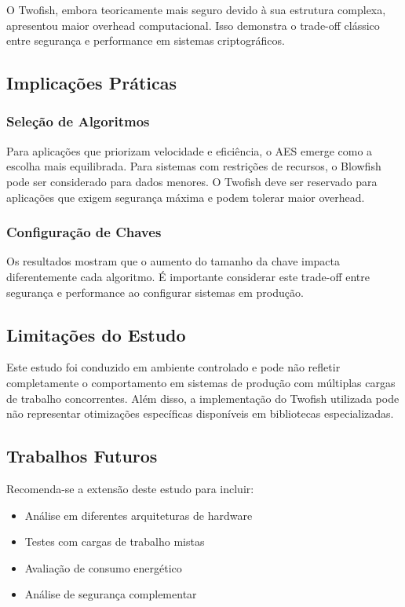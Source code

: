 \documentclass[12pt,a4paper,oneside]{article}
\begin{document}
O Twofish, embora teoricamente mais seguro devido à sua estrutura complexa, apresentou maior overhead computacional. Isso demonstra o trade-off clássico entre segurança e performance em sistemas criptográficos.

\subsection{Implicações Práticas}

\subsubsection{Seleção de Algoritmos}

Para aplicações que priorizam velocidade e eficiência, o AES emerge como a escolha mais equilibrada. Para sistemas com restrições de recursos, o Blowfish pode ser considerado para dados menores. O Twofish deve ser reservado para aplicações que exigem segurança máxima e podem tolerar maior overhead.

\subsubsection{Configuração de Chaves}

Os resultados mostram que o aumento do tamanho da chave impacta diferentemente cada algoritmo. É importante considerar este trade-off entre segurança e performance ao configurar sistemas em produção.

\subsection{Limitações do Estudo}

Este estudo foi conduzido em ambiente controlado e pode não refletir completamente o comportamento em sistemas de produção com múltiplas cargas de trabalho concorrentes. Além disso, a implementação do Twofish utilizada pode não representar otimizações específicas disponíveis em bibliotecas especializadas.

\subsection{Trabalhos Futuros}

Recomenda-se a extensão deste estudo para incluir:

\begin{itemize}
    \item Análise em diferentes arquiteturas de hardware
    \item Testes com cargas de trabalho mistas
    \item Avaliação de consumo energético
    \item Análise de segurança complementar
\end{itemize}
\end{document}
